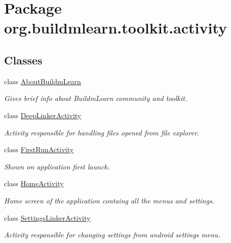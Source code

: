 \hypertarget{namespaceorg_1_1buildmlearn_1_1toolkit_1_1activity}{}\section{Package org.\+buildmlearn.\+toolkit.\+activity}
\label{namespaceorg_1_1buildmlearn_1_1toolkit_1_1activity}
\subsection*{Classes}
\begin{DoxyCompactItemize}
\item 
class \hyperlink{classorg_1_1buildmlearn_1_1toolkit_1_1activity_1_1AboutBuildmLearn}{About\+Buildm\+Learn}
\begin{DoxyCompactList}\small\item\em Gives brief info about Buildm\+Learn community and toolkit. \end{DoxyCompactList}\item 
class \hyperlink{classorg_1_1buildmlearn_1_1toolkit_1_1activity_1_1DeepLinkerActivity}{Deep\+Linker\+Activity}
\begin{DoxyCompactList}\small\item\em Activity responsible for handling files opened from file explorer. \end{DoxyCompactList}\item 
class \hyperlink{classorg_1_1buildmlearn_1_1toolkit_1_1activity_1_1FirstRunActivity}{First\+Run\+Activity}
\begin{DoxyCompactList}\small\item\em Shown on application first launch. \end{DoxyCompactList}\item 
class \hyperlink{classorg_1_1buildmlearn_1_1toolkit_1_1activity_1_1HomeActivity}{Home\+Activity}
\begin{DoxyCompactList}\small\item\em Home screen of the application containg all the menus and settings. \end{DoxyCompactList}\item 
class \hyperlink{classorg_1_1buildmlearn_1_1toolkit_1_1activity_1_1SettingsLinkerActivity}{Settings\+Linker\+Activity}
\begin{DoxyCompactList}\small\item\em Activity responsible for changing settings from android settings menu. \end{DoxyCompactList}\item 

\end{DoxyCompactItemize}
